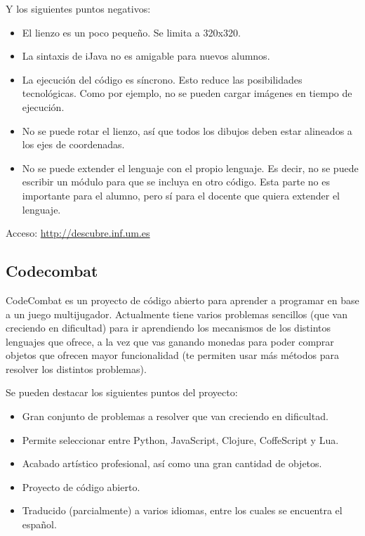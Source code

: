 \documentclass{report}
\begin{document}
	Y los siguientes puntos negativos:
	
	\begin{itemize}
		\item El lienzo es un poco pequeño. Se limita a 320x320.
		\item La sintaxis de iJava no es amigable para nuevos alumnos.
		\item La ejecución del código es síncrono. Esto reduce las posibilidades tecnológicas. Como por ejemplo, no se pueden cargar imágenes en tiempo de ejecución.
		\item No se puede rotar el lienzo, así que todos los dibujos deben estar alineados a los ejes de coordenadas.
		\item No se puede extender el lenguaje con el propio lenguaje. Es decir, no se puede escribir un módulo para que se incluya en otro código. Esta parte no es importante para el alumno, pero sí para el docente que quiera extender el lenguaje.
	\end{itemize}
	
	\hfill
	
	Acceso: \url{http://descubre.inf.um.es}
	
	\subsection{Codecombat}
	
	CodeCombat es un proyecto de código abierto para aprender a programar en base a un juego multijugador. Actualmente tiene varios problemas sencillos (que van creciendo en dificultad) para ir aprendiendo los mecanismos de los distintos lenguajes que ofrece, a la vez que vas ganando monedas para poder comprar objetos que ofrecen mayor funcionalidad (te permiten usar más métodos para resolver los distintos problemas).
	
	
	Se pueden destacar los siguientes puntos del proyecto:
	
	\begin{itemize}
		\item Gran conjunto de problemas a resolver que van creciendo en dificultad.
		\item Permite seleccionar entre Python, JavaScript, Clojure, CoffeScript y Lua.
		\item Acabado artístico profesional, así como una gran cantidad de objetos.
		\item Proyecto de código abierto.
		\item Traducido (parcialmente) a varios idiomas, entre los cuales se encuentra el español.
	\end{itemize}
	
\end{document}
